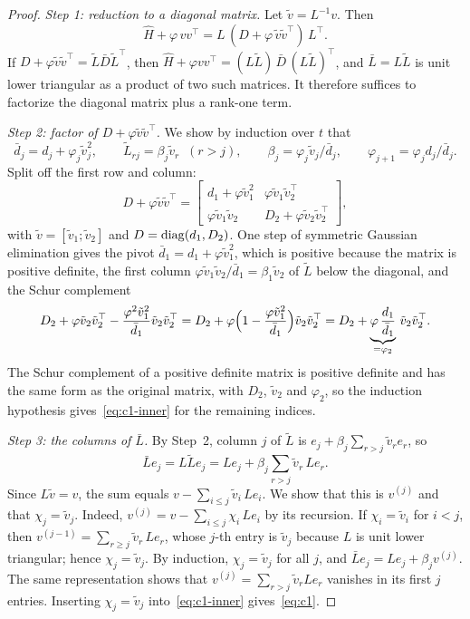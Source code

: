 \begin{proof}
\emph{Step 1: reduction to a diagonal matrix.} Let $\tilde v = L^{-1}v$. Then
\[
\hat H + \varphi\,vv^\top = L\,(D + \varphi\,\tilde v\tilde v^\top)\,L^\top .
\]
If $D + \varphi\tilde v\tilde v^\top = \tilde L\bar D\tilde L^\top$, then
$\hat H + \varphi vv^\top = (L\tilde L)\,\bar D\,(L\tilde L)^\top$, and $\bar L = L\tilde L$ is unit lower triangular
as a product of two such matrices. It therefore suffices to factorize the diagonal matrix plus
a rank-one term.

\emph{Step 2: factor of $D + \varphi\tilde v\tilde v^\top$.} We show by induction over $t$ that
\begin{equation} \label{eq:c1-inner}
\bar d_j = d_j + \varphi_j\tilde v_j^2,\qquad \tilde L_{rj} = \beta_j\tilde v_r\;\;(r>j),\qquad
\beta_j = \varphi_j\tilde v_j/\bar d_j,\qquad \varphi_{j+1} = \varphi_jd_j/\bar d_j .
\end{equation}
Split off the first row and column:
\[
D + \varphi\tilde v\tilde v^\top =
\begin{bmatrix} d_1 + \varphi\tilde v_1^2 & \varphi\tilde v_1\tilde v_2^\top\\
\varphi\tilde v_1\tilde v_2 & D_2 + \varphi\tilde v_2\tilde v_2^\top\end{bmatrix},
\]
with $\tilde v = [\tilde v_1;\tilde v_2]$ and $D = \operatorname{diag}(d_1, D_2)$. One step of symmetric Gaussian
elimination gives the pivot $\bar d_1 = d_1 + \varphi\tilde v_1^2$, which is positive because the
matrix is positive definite, the first column $\varphi\tilde v_1\tilde v_2/\bar d_1 = \beta_1\tilde v_2$ of
$\tilde L$ below the diagonal, and the Schur complement
\[
D_2 + \varphi\tilde v_2\tilde v_2^\top - \frac{\varphi^2\tilde v_1^2}{\bar d_1}\tilde v_2\tilde v_2^\top
= D_2 + \varphi\Bigl(1 - \frac{\varphi\tilde v_1^2}{\bar d_1}\Bigr)\tilde v_2\tilde v_2^\top
= D_2 + \underbrace{\varphi\,\frac{d_1}{\bar d_1}}_{=\varphi_2}\,\tilde v_2\tilde v_2^\top .
\]
The Schur complement of a positive definite matrix is positive definite and has the same form
as the original matrix, with $D_2$, $\tilde v_2$ and $\varphi_2$, so the induction hypothesis
gives~\eqref{eq:c1-inner} for the remaining indices.

\emph{Step 3: the columns of $\bar L$.} By Step~2, column $j$ of $\tilde L$ is
$e_j + \beta_j\sum_{r>j}\tilde v_re_r$, so
\[
\bar Le_j = L\tilde Le_j = Le_j + \beta_j\sum_{r>j}\tilde v_r\,Le_r .
\]
Since $L\tilde v = v$, the sum equals $v - \sum_{i\le j}\tilde v_i\,Le_i$. We show that this is
$v^{(j)}$ and that $\chi_j = \tilde v_j$. Indeed, $v^{(j)} = v - \sum_{i\le j}\chi_i\,Le_i$ by its
recursion. If $\chi_i = \tilde v_i$ for $i<j$, then $v^{(j-1)} = \sum_{r\ge j}\tilde v_r\,Le_r$, whose
$j$-th entry is $\tilde v_j$ because $L$ is unit lower triangular; hence $\chi_j = \tilde v_j$. By
induction, $\chi_j = \tilde v_j$ for all $j$, and $\bar Le_j = Le_j + \beta_jv^{(j)}$. The same
representation shows that $v^{(j)} = \sum_{r>j}\tilde v_rLe_r$ vanishes in its first $j$ entries.
Inserting $\chi_j = \tilde v_j$ into~\eqref{eq:c1-inner} gives~\eqref{eq:c1}.
\end{proof}

